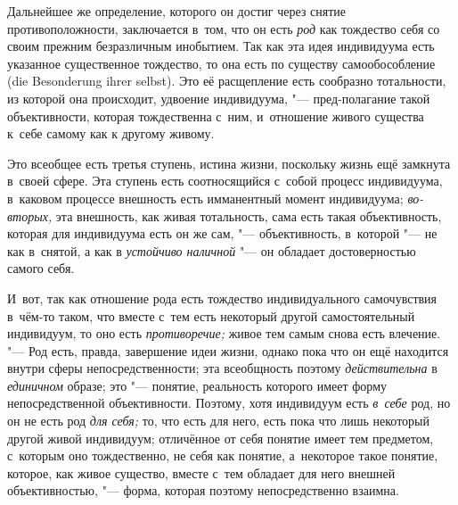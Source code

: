 Дальнейшее же определение, которого он достиг через снятие
противоположности, заключается в~том, что он есть
{\em род} как тождество
себя со своим прежним безразличным инобытием. Так как эта
идея индивидуума есть указанное существенное тождество, то она есть по
существу самообособление (die Besonderung ihrer selbst). Это
её расщепление есть сообразно тотальности, из которой она происходит,
удвоение индивидуума, "--- пред-полагание такой объективности,
которая тождественна с~ним, и~отношение живого существа к~себе самому как к
другому живому.

Это всеобщее есть третья ступень, истина жизни, поскольку
жизнь ещё замкнута в~своей сфере. Эта ступень есть соотносящийся с~собой
процесс индивидуума, в~каковом процессе внешность есть имманентный момент
индивидуума; {\em во-вторых,}
эта внешность, как живая тотальность, сама есть такая
объективность, которая для индивидуума есть он же сам, "---
объективность, в~которой "--- не как в~снятой, а
как в {\em устойчиво наличной}
"--- он обладает достоверностью самого себя.

И~вот, так как отношение рода есть тождество индивидуального
самочувствия в~чём-то таком, что вместе с~тем есть некоторый другой
самостоятельный индивидуум, то оно есть {\em противоречие;} живое
тем самым снова есть влечение. "--- Род есть, правда,
завершение идеи жизни, однако пока что он ещё находится внутри сферы
непосредственности; эта всеобщность поэтому
{\em действительна} в {\em единичном} образе;
это "--- понятие, реальность которого имеет форму
непосредственной объективности. Поэтому, хотя индивидуум есть
{\em в~себе} род, но он не есть род {\em для себя;}
то, что есть для него, есть пока что лишь некоторый другой
живой индивидуум; отличённое от себя понятие имеет тем предметом, с~которым
оно тождественно, не себя как понятие, а~некоторое такое понятие, которое,
как живое существо, вместе с~тем обладает для него внешней объективностью,
"--- форма, которая поэтому непосредственно взаимна.


